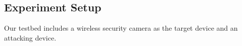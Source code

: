 





\subsection{Experiment Setup}
Our testbed includes a wireless security camera as the target device and an attacking device. 

